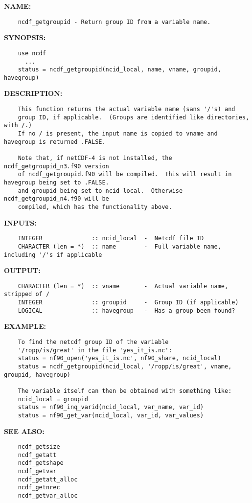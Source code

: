 \label{ch:robo91}
\label{ch:Query_ncdf_getgroupid}
\textbf{NAME:}\hspace{0.08in}\begin{Verbatim}
    ncdf_getgroupid - Return group ID from a variable name.
\end{Verbatim}
\textbf{SYNOPSIS:}\hspace{0.08in}\begin{Verbatim}
    use ncdf
      ...
    status = ncdf_getgroupid(ncid_local, name, vname, groupid, havegroup)
\end{Verbatim}
\textbf{DESCRIPTION:}\hspace{0.08in}\begin{Verbatim}
    This function returns the actual variable name (sans '/'s) and
    group ID, if applicable.  (Groups are identified like directories, with /.)
    If no / is present, the input name is copied to vname and havegroup is returned .FALSE.

    Note that, if netCDF-4 is not installed, the ncdf_getgroupid_n3.f90 version
    of ncdf_getgroupid.f90 will be compiled.  This will result in havegroup being set to .FALSE. 
    and groupid being set to ncid_local.  Otherwise ncdf_getgroupid_n4.f90 will be
    compiled, which has the functionality above.
\end{Verbatim}
\textbf{INPUTS:}\hspace{0.08in}\begin{Verbatim}
    INTEGER              :: ncid_local  -  Netcdf file ID
    CHARACTER (len = *)  :: name        -  Full variable name, including '/'s if applicable
\end{Verbatim}
\textbf{OUTPUT:}\hspace{0.08in}\begin{Verbatim}
    CHARACTER (len = *)  :: vname       -  Actual variable name, stripped of /
    INTEGER              :: groupid     -  Group ID (if applicable)
    LOGICAL              :: havegroup   -  Has a group been found?
\end{Verbatim}
\textbf{EXAMPLE:}\hspace{0.08in}\begin{Verbatim}
    To find the netcdf group ID of the variable 
    '/ropp/is/great' in the file 'yes_it_is.nc':
    status = nf90_open('yes_it_is.nc', nf90_share, ncid_local)
    status = ncdf_getgroupid(ncid_local, '/ropp/is/great', vname, groupid, havegroup)

    The variable itself can then be obtained with something like:
    ncid_local = groupid
    status = nf90_inq_varid(ncid_local, var_name, var_id)
    status = nf90_get_var(ncid_local, var_id, var_values)
\end{Verbatim}
\textbf{SEE ALSO:}\hspace{0.08in}\begin{Verbatim}
    ncdf_getsize
    ncdf_getatt
    ncdf_getshape
    ncdf_getvar
    ncdf_getatt_alloc
    ncdf_getnrec
    ncdf_getvar_alloc
\end{Verbatim}
